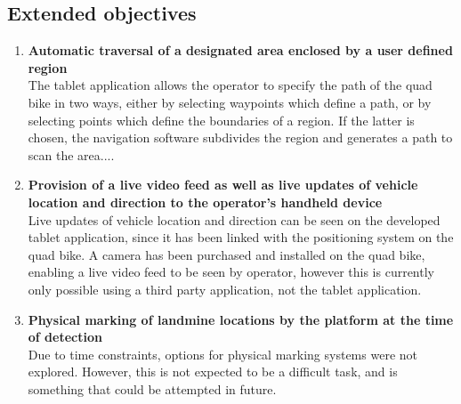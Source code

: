 \documentclass[main.tex]{subfiles}
\begin{document}
\subsection{Extended objectives}
\begin{enumerate}
\item \textbf{Automatic traversal of a designated area enclosed by a user defined region}\\ 
The tablet application allows the operator to specify the path of the quad bike in two ways, either by selecting waypoints which define a path, or by selecting points which define the boundaries of a region. If the latter is chosen, the navigation software subdivides the region and generates a path to scan the area....

\item \textbf{Provision of a live video feed as well as live updates of vehicle location and direction to the operator's handheld device}\\ 
Live updates of vehicle location and direction can be seen on the developed tablet application, since it has been linked with the positioning system on the quad bike. A camera has been purchased and installed on the quad bike, enabling a live video feed to be seen by operator, however this is currently only possible using a third party application, not the tablet application.   

\item \textbf{Physical marking of landmine locations by the platform at the time of detection}\\ 
Due to time constraints, options for physical marking systems were not explored. However, this is not expected to be a difficult task, and is something that could be attempted in future.  
\end{enumerate}
\end{document}
